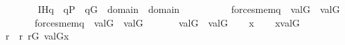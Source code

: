 \begin{isabellebody}
\ \ \ \ \isanewline
\ \ \ \ IH{\isacharcolon}{\kern0pt}{\isachardoublequoteopen}{\isasymAnd}q\ {\isasymsigma}{\isachardot}{\kern0pt}\ q{\isasymin}P\ {\isasymLongrightarrow}\ q{\isasymin}G\ {\isasymLongrightarrow}\ {\isasymsigma}{\isasymin}domain{\isacharparenleft}{\kern0pt}{\isasymtau}{\isacharparenright}{\kern0pt}\ {\isasymunion}\ domain{\isacharparenleft}{\kern0pt}{\isasymtheta}{\isacharparenright}{\kern0pt}\ {\isasymLongrightarrow}\ \isanewline
\ \ \ \ \ \ \ \ {\isacharparenleft}{\kern0pt}forces{\isacharunderscore}{\kern0pt}mem{\isacharparenleft}{\kern0pt}q{\isacharcomma}{\kern0pt}{\isasymsigma}{\isacharcomma}{\kern0pt}{\isasymtau}{\isacharparenright}{\kern0pt}\ {\isasymlongrightarrow}\ val{\isacharparenleft}{\kern0pt}G{\isacharcomma}{\kern0pt}{\isasymsigma}{\isacharparenright}{\kern0pt}\ {\isasymin}\ val{\isacharparenleft}{\kern0pt}G{\isacharcomma}{\kern0pt}{\isasymtau}{\isacharparenright}{\kern0pt}{\isacharparenright}{\kern0pt}\ {\isasymand}\isanewline
\ \ \ \ \ \ \ \ {\isacharparenleft}{\kern0pt}forces{\isacharunderscore}{\kern0pt}mem{\isacharparenleft}{\kern0pt}q{\isacharcomma}{\kern0pt}{\isasymsigma}{\isacharcomma}{\kern0pt}{\isasymtheta}{\isacharparenright}{\kern0pt}\ {\isasymlongrightarrow}\ val{\isacharparenleft}{\kern0pt}G{\isacharcomma}{\kern0pt}{\isasymsigma}{\isacharparenright}{\kern0pt}\ {\isasymin}\ val{\isacharparenleft}{\kern0pt}G{\isacharcomma}{\kern0pt}{\isasymtheta}{\isacharparenright}{\kern0pt}{\isacharparenright}{\kern0pt}{\isachardoublequoteclose}\isanewline
\ \ \isanewline
\ \ \ \ {\isachardoublequoteopen}val{\isacharparenleft}{\kern0pt}G{\isacharcomma}{\kern0pt}{\isasymtheta}{\isacharparenright}{\kern0pt}\ {\isasymsubseteq}\ val{\isacharparenleft}{\kern0pt}G{\isacharcomma}{\kern0pt}{\isasymtau}{\isacharparenright}{\kern0pt}{\isachardoublequoteclose}\isanewline
%
\isadelimproof
%
\endisadelimproof
%
\isatagproof
{}\isamarkupfalse%
\isanewline
\ \ \isamarkupfalse%
\ x\isanewline
\ \ \isamarkupfalse%
\ {\isachardoublequoteopen}x{\isasymin}val{\isacharparenleft}{\kern0pt}G{\isacharcomma}{\kern0pt}{\isasymtheta}{\isacharparenright}{\kern0pt}{\isachardoublequoteclose}\isanewline
\ \ \isamarkupfalse%
\isanewline
\ \ \isamarkupfalse%
\ {\isasymsigma}\ r\ \ {\isachardoublequoteopen}{\isasymlangle}{\isasymsigma}{\isacharcomma}{\kern0pt}r{\isasymrangle}{\isasymin}{\isasymtheta}{\isachardoublequoteclose}\ {\isachardoublequoteopen}r{\isasymin}G{\isachardoublequoteclose}\ {\isachardoublequoteopen}val{\isacharparenleft}{\kern0pt}G{\isacharcomma}{\kern0pt}{\isasymsigma}{\isacharparenright}{\kern0pt}{\isacharequal}{\kern0pt}x{\isachardoublequoteclose}\ \isamarkupfalse%

\end{isabellebody}
